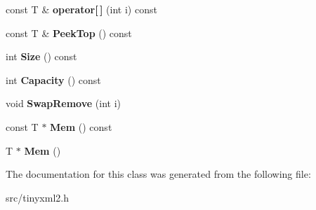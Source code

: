 \begin{DoxyCompactItemize}
\item 
\mbox{\label{classCPlantBox_1_1tinyxml2_1_1DynArray_a2a0a7dd9b213a53d0345562c85c0b579}} 
const T \& {\bfseries operator\mbox{[}$\,$\mbox{]}} (int i) const
\item 
\mbox{\label{classCPlantBox_1_1tinyxml2_1_1DynArray_ad1fcf896ba95a8bc55a3feb09b07a19e}} 
const T \& {\bfseries Peek\+Top} () const
\item 
\mbox{\label{classCPlantBox_1_1tinyxml2_1_1DynArray_a43d33d2a83488a6ba624c40189dc8e7b}} 
int {\bfseries Size} () const
\item 
\mbox{\label{classCPlantBox_1_1tinyxml2_1_1DynArray_a172544ae6866fd3b7759c0b354afcb6a}} 
int {\bfseries Capacity} () const
\item 
\mbox{\label{classCPlantBox_1_1tinyxml2_1_1DynArray_a35f904d96268c97ecc6d7879221ad827}} 
void {\bfseries Swap\+Remove} (int i)
\item 
\mbox{\label{classCPlantBox_1_1tinyxml2_1_1DynArray_a33a3dfed2b9d5630179bc26f49121723}} 
const T $\ast$ {\bfseries Mem} () const
\item 
\mbox{\label{classCPlantBox_1_1tinyxml2_1_1DynArray_ad281b5d8a871034edf1279daa333f540}} 
T $\ast$ {\bfseries Mem} ()
\end{DoxyCompactItemize}


The documentation for this class was generated from the following file\+:\begin{DoxyCompactItemize}
\item 
src/tinyxml2.\+h\end{DoxyCompactItemize}
